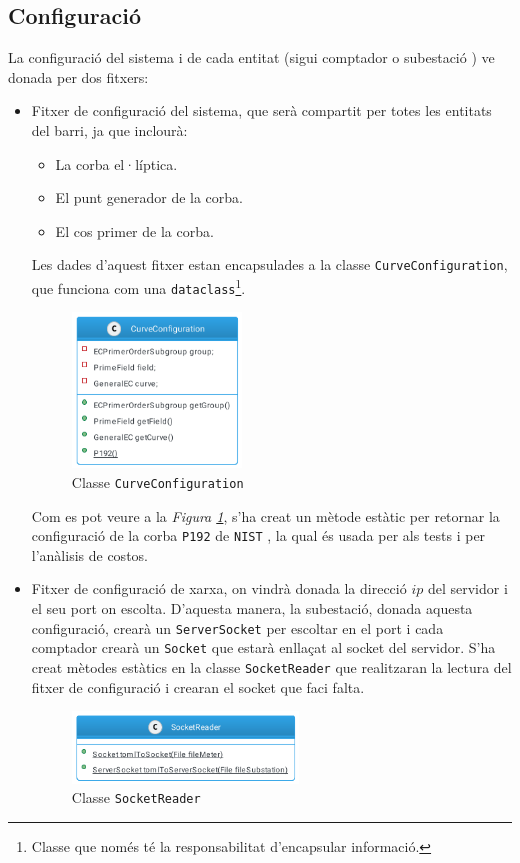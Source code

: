 \subsection{Configuració}
La configuració del sistema i de cada entitat (sigui comptador o subestació ) ve donada per dos fitxers:
\begin{itemize}
	\item Fitxer de configuració del sistema, que serà compartit per totes les entitats del barri, ja que inclourà:
	\begin{itemize}
		\item La corba el·líptica.
		\item El punt generador de la corba.
		\item El cos primer de la corba.
	\end{itemize}
	Les dades d'aquest fitxer estan encapsulades a la classe \texttt{CurveConfiguration}, que funciona com una \texttt{dataclass}\footnote{Classe que només té la responsabilitat d'encapsular informació.}.
	\begin{figure}[H]
		\centering
		\includegraphics[width=4.5cm]{classes/curve.png}
		\caption{Classe \texttt{CurveConfiguration}}
		\label{fig:curve}
	\end{figure}
	Com es pot veure a la \textit{Figura \ref{fig:curve}}, s'ha creat un mètode estàtic per retornar la configuració de la corba \texttt{P192} de \texttt{NIST} \cite{p192}, la qual és usada per als tests i per l'anàlisis de costos.
	\item Fitxer de configuració de xarxa, on vindrà donada la direcció $ip$ del servidor i el seu port on escolta. D'aquesta manera, la subestació, donada aquesta configuració, crearà un \texttt{ServerSocket} per escoltar en el port i cada comptador crearà un \texttt{Socket} que estarà enllaçat al socket del servidor. S'ha creat mètodes estàtics en la classe \texttt{SocketReader} que realitzaran la lectura del fitxer de configuració i crearan el socket que faci falta.
	\begin{figure}[H]
		\centering
		\includegraphics[width=6cm]{classes/socket.png}
		\caption{Classe \texttt{SocketReader}}
		\label{fig:socket}
	\end{figure}
	
\end{itemize}
